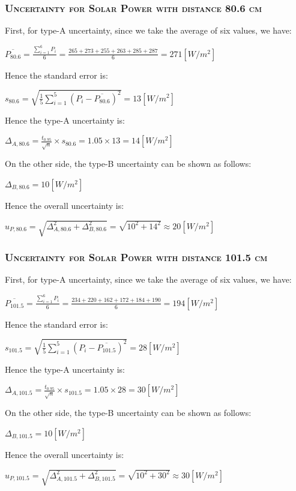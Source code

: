 \documentclass[a4paper,12pt]{article}
\begin{document}
\begin{appendices}
\subsubsection{\textsc{Uncertainty for Solar Power with distance 80.6 cm}}
First, for type-A uncertainty, since we take the average of six values, we have:
\begin{center}
$ \displaystyle \overline{P_{80.6}} = \frac{\sum_{i=1}^6P_i}{6} = \frac{265 + 273 + 255 + 263 + 285 + 287}{6} = 271 [W/m^2] $
\end{center}
Hence the standard error is:
\begin{center}
$ \displaystyle s_{80.6} = \sqrt{\frac{1}{5}\sum_{i=1}^5(P_i - \overline{P_{80.6}})^2 } = 13 [W/m^2] $
\end{center}
Hence the type-A uncertainty is:
\begin{center}
$ \displaystyle \Delta_{A,80.6} = \frac{t_{0.95}}{\sqrt{n}} \times s_{80.6} = 1.05 \times 13 = 14 [W/m^2] $
\end{center}
\par On the other side, the type-B uncertainty can be shown as follows:
\begin{center}
$ \displaystyle \Delta_{B,80.6} = 10 [W/m^2] $
\end{center}
Hence the overall uncertainty is:
\begin{center}
$ \displaystyle u_{P,80.6} = \sqrt{\Delta_{A,80.6}^2 + \Delta_{B,80.6}^2} = \sqrt{10^2 + 14^2} \approx 20 [W/m^2]$
\end{center}


\subsubsection{\textsc{Uncertainty for Solar Power with distance 101.5 cm}}
First, for type-A uncertainty, since we take the average of six values, we have:
\begin{center}
$ \displaystyle \overline{P_{101.5}} = \frac{\sum_{i=1}^6P_i}{6} = \frac{234 + 220 + 162 + 172 + 184 + 190}{6} = 194 [W/m^2] $
\end{center}
Hence the standard error is:
\begin{center}
$ \displaystyle s_{101.5} = \sqrt{\frac{1}{5}\sum_{i=1}^5(P_i - \overline{P_{101.5}})^2 } = 28 [W/m^2] $
\end{center}
Hence the type-A uncertainty is:
\begin{center}
$ \displaystyle \Delta_{A,101.5} = \frac{t_{0.95}}{\sqrt{n}} \times s_{101.5} = 1.05 \times 28 = 30 [W/m^2] $
\end{center}
\par On the other side, the type-B uncertainty can be shown as follows:
\begin{center}
$ \displaystyle \Delta_{B,101.5} = 10 [W/m^2] $
\end{center}
Hence the overall uncertainty is:
\begin{center}
$ \displaystyle u_{P,101.5} = \sqrt{\Delta_{A,101.5}^2 + \Delta_{B,101.5}^2} = \sqrt{10^2 + 30^2} \approx 30 [W/m^2]$
\end{center}


\end{appendices}
\end{document}
